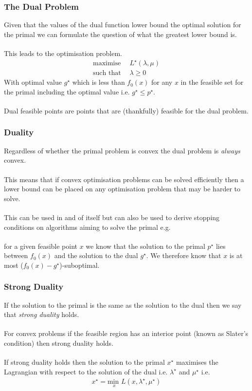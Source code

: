 \documentclass{beamer}
\begin{document}
\begin{frame}
    \frametitle{The Dual Problem}
    Given that the values of the dual function lower bound the optimal solution
    for the primal we can formulate the question of what the greatest lower
    bound is.
    \\~\\
    This leads to the optimisation problem.
    {\footnotesize
    \begin{align*}
        \text{maximise } \, &L^{\star}(\lambda, \mu)\\
        \text{such that } &\lambda \geq 0
    \end{align*}}
    \hspace{-1mm}With optimal value $g^{\star}$ which is less than $f_{0}(x)$ for any
    $x$ in the feasible set for the primal including the optimal value i.e.
    $g^{\star} \leq p^{\star}$.
    \\~\\
    Dual feasible points are points that are (thankfully) feasible for the dual
    problem.

\end{frame}

\begin{frame}
    \frametitle{Duality}
    Regardless of whether the primal problem is convex the dual problem is
    \textit{always} convex.
    \\~\\
    This means that if convex optimisation problems can be solved efficiently
    then a lower bound can be placed on any optimisation problem that may be
    harder to solve.
    \\~\\
    This can be used in and of itself but can also be used to derive stopping
    conditions on algorithms aiming to solve the primal e.g.
    \\~\\
    for a given
    feasible point $x$ we know that the solution to the primal $p^{\star}$ lies
    between $f_{0}(x)$ and the solution to the dual $g^{\star}$. We therefore know that $x$
    is at most ($f_{0}(x) - g^{\star}$)-suboptimal.
\end{frame}

\begin{frame}
    \frametitle{Strong Duality}
    If the solution to the primal is the same as the solution to the dual
    then we say that \textit{strong duality} holds.
    \\~\\
    For convex problems if the feasible region has an interior point (known as
    Slater's condition) then strong duality holds.
    \\~\\
    If strong duality holds then the solution to the primal $x^{\star}$
    maximises the Lagrangian with respect to the solution of the dual i.e.
    $\lambda^{\star}$ and $\mu^{\star}$ i.e.
    \begin{align*}
        x^{\star} = \underset{x}{\text{min }} L(x, \lambda^{\star}, \mu^{\star})
    \end{align*}
\end{frame}
\end{document}
